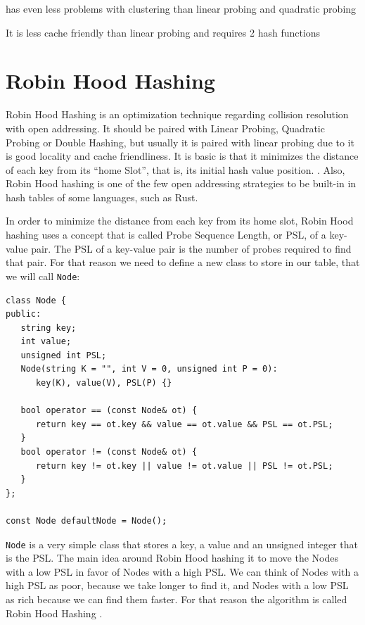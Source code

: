 \rightthumbsup has even less problems with clustering than linear probing and quadratic probing

\rightthumbsdown It is less cache friendly than linear probing and requires 2 hash functions

\section{Robin Hood Hashing}

Robin Hood Hashing is an optimization technique regarding collision resolution with open addressing. It should be paired with Linear Probing, Quadratic Probing or Double Hashing, but usually it is paired with linear probing due to it is good locality and cache friendliness. It is basic is that it minimizes the distance of each key from its ``home Slot'', that is, its initial hash value position. \citep{RobinHoodHashing}. Also, Robin Hood hashing is one of the few open addressing strategies to be built-in in hash tables of some languages, such as Rust.

In order to minimize the distance from each key from its home slot, Robin Hood hashing uses a concept that is called Probe Sequence Length, or PSL, of a key-value pair. The PSL of a key-value pair is the number of probes required to find that pair. For that reason we need to define a new class to store in our table, that we will call \texttt{Node}:

\newpage

\begin{lstlisting}
class Node {
public:
   string key;
   int value;
   unsigned int PSL;   
   Node(string K = "", int V = 0, unsigned int P = 0):
      key(K), value(V), PSL(P) {}

   bool operator == (const Node& ot) {
      return key == ot.key && value == ot.value && PSL == ot.PSL;
   }
   bool operator != (const Node& ot) {
      return key != ot.key || value != ot.value || PSL != ot.PSL;
   }
};

const Node defaultNode = Node();
\end{lstlisting}

\texttt{Node} is a very simple class that stores a key, a value and an unsigned integer that is the PSL. The main idea around Robin Hood hashing it to move the Nodes with a low PSL in favor of Nodes with a high PSL. We can think of Nodes with a high PSL as poor, because we take longer to find it, and Nodes with a low PSL as rich because we can find them faster. For that reason the algorithm is called Robin Hood Hashing \citep{RobinHoodHashing}.

